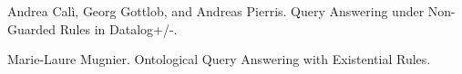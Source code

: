 
\begin{thebibliography}{1}

Andrea Calì, Georg Gottlob, and Andreas Pierris.
\newblock Query Answering under Non-Guarded Rules in Datalog+/-.

Marie-Laure Mugnier.
\newblock Ontological Query Answering with Existential Rules.


\end{thebibliography}

\newpage


%

